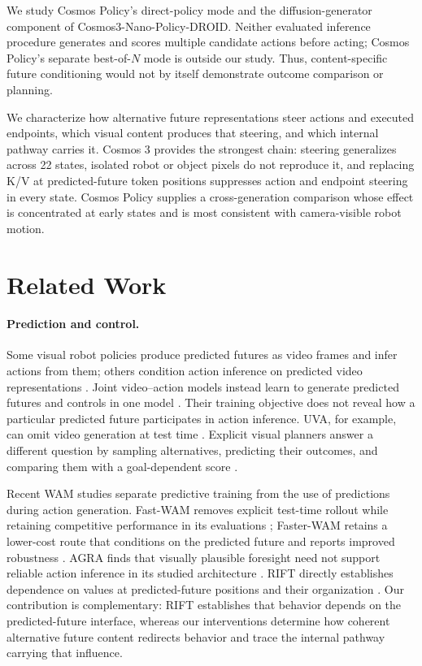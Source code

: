\documentclass{article}
\begin{document}
We study Cosmos Policy's direct-policy mode and the diffusion-generator component of Cosmos3-Nano-Policy-DROID. Neither evaluated inference procedure generates and scores multiple candidate actions before acting; Cosmos Policy's separate best-of-$N$ mode is outside our study. Thus, content-specific future conditioning would not by itself demonstrate outcome comparison or planning.

We characterize how alternative future representations steer actions and executed endpoints, which visual content produces that steering, and which internal pathway carries it. Cosmos 3 provides the strongest chain: steering generalizes across 22 states, isolated robot or object pixels do not reproduce it, and replacing K/V at predicted-future token positions suppresses action and endpoint steering in every state. Cosmos Policy supplies a cross-generation comparison whose effect is concentrated at early states and is most consistent with camera-visible robot motion.

\section{Related Work}
\label{sec:related}

\paragraph{Prediction and control.}
Some visual robot policies produce predicted futures as video frames and infer actions from them; others condition action inference on predicted video representations \citep{du2023unipi,hu2025vpp}. Joint video--action models instead learn to generate predicted futures and controls in one model \citep{guo2024pad,li2025uva,kim2026cosmospolicy,nvidia2026cosmos3,ye2026dreamzero}. Their training objective does not reveal how a particular predicted future participates in action inference. UVA, for example, can omit video generation at test time \citep{li2025uva}. Explicit visual planners answer a different question by sampling alternatives, predicting their outcomes, and comparing them with a goal-dependent score \citep{ebert2018visualforesight,du2024videolanguage}.

Recent WAM studies separate predictive training from the use of predictions during action generation. Fast-WAM removes explicit test-time rollout while retaining competitive performance in its evaluations \citep{yuan2026fastwam}; Faster-WAM retains a lower-cost route that conditions on the predicted future and reports improved robustness \citep{zhao2026fasterwam}. AGRA finds that visually plausible foresight need not support reliable action inference in its studied architecture \citep{qiu2026agra}. RIFT directly establishes dependence on values at predicted-future positions and their organization \citep{zhang2026rift}. Our contribution is complementary: RIFT establishes that behavior depends on the predicted-future interface, whereas our interventions determine how coherent alternative future content redirects behavior and trace the internal pathway carrying that influence.
\end{document}
